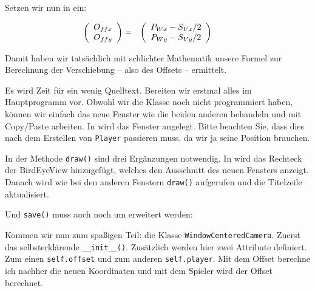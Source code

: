 Setzen wir nun  in  ein:

\begin{align}
	\left(\begin{array}{c} O_{ffx} \\ O_{ffy} \end{array}\right) &=& \left(\begin{array}{c}   P_{Wx} - S_{Vx} / 2\\  P_{Wy} - S_{Vy} / 2\end{array}\right) & \hspace{0.5cm}\label{off03}
\end{align}

Damit haben wir tatsächlich mit schlichter Mathematik unsere Formel zur Berechnung der Verschiebung -- also des Offsets -- ermittelt.

Es wird Zeit für ein wenig Quelltext. Bereiten wir erstmal alles im Hauptprogramm vor. Obwohl wir die Klasse noch nicht programmiert haben, können wir einfach das neue Fenster wie die beiden anderen behandeln und mit Copy/Paste arbeiten. In  wird das Fenster angelegt. Bitte beachten Sie, dass dies nach dem Erstellen von \texttt{Player} passieren muss, da wir ja seine Position brauchen.


In der Methode \texttt{draw()} sind drei Ergänzungen notwendig. In  wird das Rechteck der BirdEyeView hinzugefügt, welches den Ausschnitt des neuen Fensters anzeigt. Danach wird wie bei den anderen Fenstern \texttt{draw()} aufgerufen und die Titelzeile aktualisiert.


Und \texttt{save()} muss auch noch um  erweitert werden:


Kommen wir nun zum spaßigen Teil: die Klasse \texttt{WindowCenteredCamera}. Zuerst das selbsterklärende \texttt{\_\_init\_\_()}. Zusätzlich werden hier zwei Attribute definiert. Zum einen \texttt{self.offset} und zum anderen \texttt{self.player}. Mit dem Offset berechne ich nachher die neuen Koordinaten und mit dem Spieler wird der Offset berechnet. 
 
